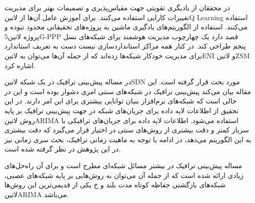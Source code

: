 در  محققان از یادیگری تقویتی جهت مقیاس‌پذیری و تصمیمات بهتر برای مدیریت تغییرات کارایی استفاده می‌کنند. برای آموزش عامل آن‌ها از ‌لاتین{Q Learning}
استفاده می‌کنند. استفاده از الگوریتم‌های یادگیری ماشین به پروژه‌های تحقیقاتی محدود نبوده و پروژه ‌لاتین{5G-PPP} قصد دارد یک چهارچوب مدیریت هوشمند برای شبکه‌های نسل پنجم
طراحی کند. در کنار همه مراکز استانداردسازی نیست دست به تعریف استاندارد برای مدیریت خودکار شبکه‌ها زده‌اند که از جمله آن‌ها می‌توان به ‌لاتین{ENI} و ‌لاتین{ZSM} اشاره کرد.

در  مساله پیش‌بینی ترافیک در یک شبکه ‌لاتین{SDN} مورد بحث قرار گرفته است. این مقاله بیان می‌کند پیش‌بینی ترافیک در
شبکه‌های سنتی امری دشوار بوده است و این در حالی است که شبکه‌های نرم‌افزار بنیان توانایی بیشتری برای این امر دارند. در این تحقیق از اطلاعات لایه
داده برای جریان‌های شبکه در جهت پیش‌بینی ترافیک بر پایه روش ‌لاتین{ARIMA} استفاده می‌شود.
اطلاعات لایه داده برای جریان‌های ترافیکی با سربار کمتر و دقت بیشتری از روش‌های سنتی در اختیار قرار می‌گیرد که دقت بیشتری به این الگوریتم می‌دهد،
در ادامه با توجه به ماهیت زمانی ترافیک، بحث سری زمانی نیز در این پژوهش در نظر گرفته شده است.

مساله پیش‌بینی ترافیک در بیشتر مسائل شبکه‌ای مطرح است و برای آن راه‌حل‌های زیادی ارائه شده است که از جمله آن می‌توان به روش‌هایی بر پایه شبکه‌های عصبی،
شبکه‌های بازگشتی حفاظه کوتاه مدت بلند و ‌خ
یکی از قدیمی‌ترین این روش‌ها ‌لاتین{ARIMA} می‌باشد.
